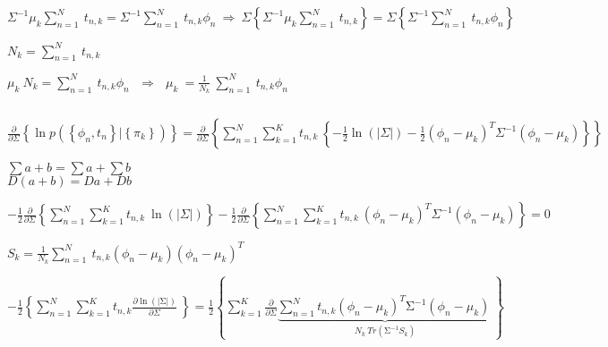 \documentclass{article}
\begin{document}
$ \displaystyle
    \Sigma^{-1}\mu_k\sum_{n=1}^{N}{\ t_{n,k}}=\Sigma^{-1}\sum_{n=1}^{N}{\ t_{n,k}\phi_n}\ \Longrightarrow\ \Sigma\left\{\Sigma^{-1}\mu_k\sum_{n=1}^{N}{\ t_{n,k}}\right\}=\Sigma\left\{\Sigma^{-1}\sum_{n=1}^{N}{\ t_{n,k}\phi_n}\right\}\ \ 
$

\begin{center}
    $ \displaystyle N_k=\sum_{n=1}^{N}{\ t_{n,k}} $
\end{center}

$ \displaystyle
    \mu_k\ N_k=\sum_{n=1}^{N}{\ t_{n,k}\phi_n}\ \ \ \Longrightarrow\ \ \ \mu_k\ =\frac{1}{N_k}\ \sum_{n=1}^{N}{\ t_{n,k}\phi_n}\ 
$

\begin{center}
    $  $
\end{center}

$ \displaystyle
    \frac{\partial}{\partial\Sigma}\left\{\ln{p\left(\left\{\phi_n,t_n\right\}|\left\{\pi_k\right\}\right)}\right\}=\frac{\partial}{\partial\Sigma}\left\{\sum_{n=1}^{N}\sum_{k=1}^{K}{t_{n,k}\ \left\{-\frac{1}{2}\ln{\left(\left|\Sigma\right|\right)}-\frac{1}{2}\left(\phi_n-\mu_k\right)^T\Sigma^{-1}\left(\phi_n-\mu_k\right)\right\}}\right\}
$

\begin{center}
    $\displaystyle \sum{a+b}=\sum a+\sum b $ \\
    $\displaystyle D\left(a+b\right)=Da+Db $
\end{center}

$ \displaystyle
    -\frac{1}{2}\frac{\partial}{\partial\Sigma}\left\{\sum_{n=1}^{N}\sum_{k=1}^{K}{t_{n,k}\ \ln{\left(\left|\Sigma\right|\right)}}\right\}-\frac{1}{2}\frac{\partial}{\partial\Sigma}\left\{\sum_{n=1}^{N}\sum_{k=1}^{K}{t_{n,k}\ \left(\phi_n-\mu_k\right)^T\Sigma^{-1}\left(\phi_n-\mu_k\right)}\right\}=0
$

\begin{center}
    $ \displaystyle S_k=\frac{1}{N_k}\sum_{n=1}^{N}{\ t_{n,k}\left(\phi_n-\mu_k\right)\left(\phi_n-\mu_k\right)^T} $
\end{center}

$ \displaystyle
    -\frac{1}{2}\left\{\sum_{n=1}^{N}\sum_{k=1}^{K}{t_{n,k}\frac{\partial \ln {\left(\left|\mathrm{\Sigma}\right|\right)}}{\partial\Sigma}\ }\right\}=\frac{1}{2}
    \left\{
        \sum_{k=1}^{K}{
            \frac{\partial}{\partial\Sigma}{
                \underbrace{\sum_{n=1}^{N}{t_{n,k}\left(\phi_n-\mu_k\right)^T\mathrm{\Sigma}^{-1}\left(\phi_n-\mu_k\right)\ }}_{N_k\ Tr\left(\mathrm{\Sigma}^{-1}S_k\right)}}
        }
    \right\}
$
\end{document}
